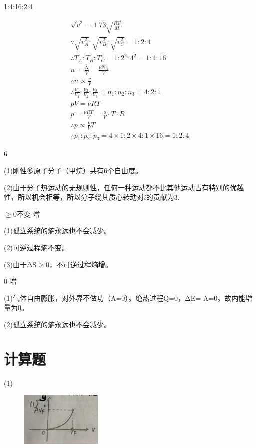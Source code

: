 \documentclass[b5paper,opensource]{./template/qyxf-book}
\begin{document}
 1:4:16:2:4

\solve

$$
\begin{array}{*{20}{c}}
 \sqrt { \bar { v } ^ { 2 } } = 1.73 \sqrt { \frac { R T } { M } } \\ \because \sqrt { \bar { v } _ { A } ^ { 2 } } : \sqrt { \bar { v } _ { B } ^ { 2 } }  : \sqrt { \bar { v } _ { C } ^ { 2 } } = 1 : 2 : 4 \\ \therefore T _ { A } : T _ { B } : T _ { C } = 1 : 2 ^ { 2 } : 4 ^ { 2 } = 1 : 4 : 16 \\ n = \frac { N } { V } = \frac { \nu N _ { A } } { V } \\ \therefore n \propto \frac { \nu } { V }\\ \therefore \frac { \nu _ { 1 } } { V _ { 1 } } : \frac { \nu _ { 2 } } { V _ { 2 } } : \frac { \nu _ { 3 } } { V _ { 3 } }  = n _ { 1 } : n _ { 2 } : n _ { 3 } = 4 : 2 : 1 \\ p V  = \nu R T \\ p = \frac { \nu R T } { V }  = \frac { \nu } { V } \cdot T \cdot R \\ \therefore p  \propto \frac { \nu } { V } T \\ \therefore p _ { 1 } : p _ { 2 } : p _ { 3 } = 4 \times 1 : 2 \times 4 : 1 \times 16 = 1 : 2 : 4  
\end{array}
$$

6

\solve (1)刚性多原子分子（甲烷）共有6个自由度。

(2)由于分子热运动的无规则性，任何一种运动都不比其他运动占有特别的优越性，所以机会相等，所以分子绕其质心转动对$i$的贡献为3.

$\geqslant 0 $\qquad 不变 \qquad 增

\solve
(1)孤立系统的熵永远也不会减少。

(2)可逆过程熵不变。

(3)由于ΔS$\geqslant 0$，不可逆过程熵增。


0 \qquad 增

\solve(1)气体自由膨胀，对外界不做功（A=0）。绝热过程Q=0，ΔE=-A=0。故内能增量为0。

(2)孤立系统的熵永远也不会减少。


\section{计算题}

\solve
(1)
\begin{figure}[!ht]
	\centering
	\includegraphics[width=0.35\textwidth]{Chp12_21.jpg}
\end{figure}
\end{document}
